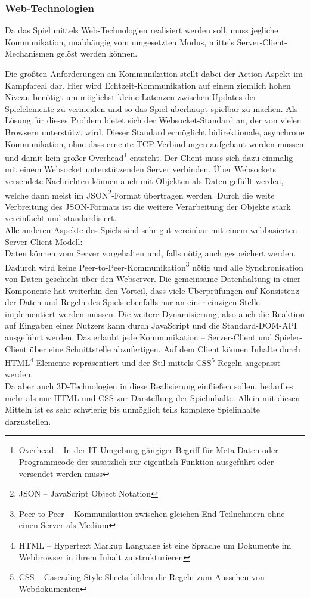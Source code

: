 \subsubsection{Web-Technologien}
Da das Spiel mittels Web-Technologien realisiert werden soll, muss jegliche Kommunikation, unabhängig vom umgesetzten Modus, mittels Server-Client-Mechanismen gelöst werden können.


Die größten Anforderungen an Kommunikation stellt dabei der Action-Aspekt im Kampfareal dar. Hier wird Echtzeit-Kommunikation auf einem ziemlich hohen Niveau benötigt um möglichst kleine Latenzen zwischen Updates der Spielelemente zu vermeiden und so das Spiel überhaupt spielbar zu machen. Als Lösung für dieses Problem bietet sich der Websocket-Standard an, der von vielen Browsern unterstützt wird. Dieser Standard ermöglicht bidirektionale, asynchrone Kommunikation, ohne dass erneute TCP-Verbindungen aufgebaut werden müssen und damit kein großer Overhead\footnote{Overhead -- In der IT-Umgebung gängiger Begriff für Meta-Daten oder Programmcode der zusätzlich zur eigentlich Funktion ausgeführt oder versendet werden muss} entsteht. Der Client muss sich dazu einmalig mit einem Websocket unterstützenden Server verbinden. Über Websockets versendete Nachrichten können auch mit Objekten als Daten gefüllt werden, welche dann meist im JSON\footnote{JSON -- JavaScript Object Notation}-Format übertragen werden. Durch die weite Verbreitung des JSON-Formats ist die weitere Verarbeitung der Objekte stark vereinfacht und standardisiert.\\
Alle anderen Aspekte des Spiels sind sehr gut vereinbar mit einem webbasierten Server-Client-Modell:\\
Daten können vom Server vorgehalten und, falls nötig auch gespeichert werden. Dadurch wird keine Peer-to-Peer-Kommunikation\footnote{Peer-to-Peer -- Kommunikation zwischen gleichen End-Teilnehmern ohne einen Server als Medium} nötig und alle Synchronisation von Daten geschieht über den Webserver. Die gemeinsame Datenhaltung in einer Komponente hat weiterhin den Vorteil, dass viele Überprüfungen auf Konsistenz der Daten und Regeln des Spiels ebenfalls nur an einer einzigen Stelle implementiert werden müssen.
Die weitere Dynamisierung, also auch die Reaktion auf Eingaben eines Nutzers kann durch JavaScript und die Standard-DOM-API ausgeführt werden. Das erlaubt jede Kommunikation -- Server-Client und Spieler-Client über eine Schnittstelle abzufertigen.
Auf dem Client können Inhalte durch HTML\footnote{HTML -- Hypertext Markup Language ist eine Sprache um Dokumente im Webbrowser in ihrem Inhalt zu strukturieren }-Elemente repräsentiert und der Stil mittels CSS\footnote{CSS -- Cascading Style Sheets bilden die Regeln zum Aussehen von Webdokumenten}-Regeln angepasst werden.\\
Da aber auch 3D-Technologien in diese Realisierung einfließen sollen, bedarf es mehr als nur HTML und CSS zur Darstellung der Spielinhalte. Allein mit diesen Mitteln ist es sehr schwierig bis unmöglich teils komplexe Spielinhalte darzustellen.
